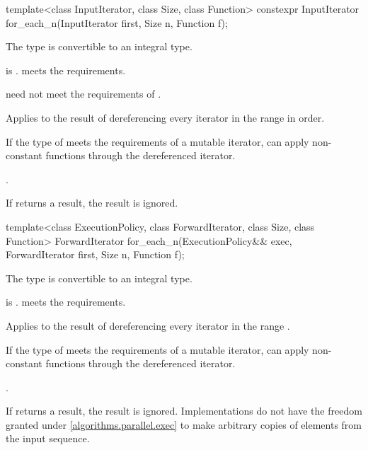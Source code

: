 %
\begin{itemdecl}
template<class InputIterator, class Size, class Function>
  constexpr InputIterator for_each_n(InputIterator first, Size n, Function f);
\end{itemdecl}

\begin{itemdescr}
\pnum
\mandates
The type  is convertible
to an integral type.

\pnum
\expects
{} is .
 meets the  requirements.
\begin{note}
 need not meet
the requirements of .
\end{note}

\pnum
\effects
Applies  to the result of dereferencing
every iterator in the range  in order.
\begin{note}
If the type of  meets the requirements of a mutable iterator,
 can apply non-constant functions through the dereferenced iterator.
\end{note}

\pnum
\returns
{}.

\pnum
\remarks
If  returns a result, the result is ignored.
\end{itemdescr}

%
\begin{itemdecl}
template<class ExecutionPolicy, class ForwardIterator, class Size, class Function>
  ForwardIterator for_each_n(ExecutionPolicy&& exec, ForwardIterator first, Size n,
                             Function f);
\end{itemdecl}

\begin{itemdescr}
\pnum
\mandates
The type  is convertible
to an integral type.

\pnum
\expects
{} is .
 meets the  requirements.

\pnum
\effects
Applies  to the result of dereferencing
every iterator in the range .
\begin{note}
If the type of  meets the requirements of a mutable iterator,
 can apply non-constant functions through the dereferenced iterator.
\end{note}

\pnum
\returns
{}.

\pnum
\remarks
If  returns a result, the result is ignored.
Implementations do not have
the freedom granted under \ref{algorithms.parallel.exec}
to make arbitrary copies of elements from the input sequence.
\end{itemdescr}

